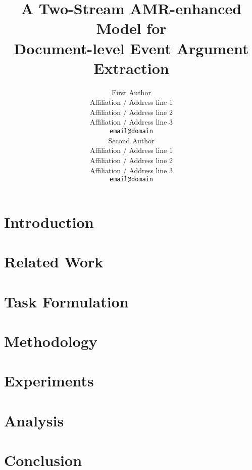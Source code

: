 \documentclass[11pt]{article}
\title{A Two-Stream AMR-enhanced Model for \\ Document-level Event Argument Extraction}
\author{First Author \\
  Affiliation / Address line 1 \\
  Affiliation / Address line 2 \\
  Affiliation / Address line 3 \\
  \texttt{email@domain} \\\And
  Second Author \\
  Affiliation / Address line 1 \\
  Affiliation / Address line 2 \\
  Affiliation / Address line 3 \\
  \texttt{email@domain} \\}
\begin{document}
\maketitle
\newcommand{\tianyu}[1]{\textcolor{orange}{\bf \small [ #1 --Tianyu]}}
\newcommand{\modelname}{\textsc{Tsar}\xspace}
\newcommand{\modelnamebase}{\textsc{Tsar}$_{\mathrm{base}}$\xspace}
\newcommand{\modelnamelarge}{\textsc{Tsar}$_{\mathrm{large}}$\xspace}
\newcommand{\vect}[1]{\mathbf{#1}}



\section{Introduction}


\section{Related Work}


\section{Task Formulation}


\section{Methodology}


\section{Experiments}


\section{Analysis}


\section{Conclusion}





\clearpage
\appendix

\end{document}

